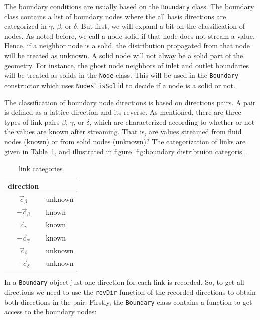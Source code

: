\documentclass[11pt,a4paper]{report}
\begin{document}
The boundary conditions are usually based on the \texttt{Boundary} class. The boundary class contains a list of  boundary nodes where the all basis directions are categorized in $\gamma$, $\beta$, or $\delta$. 
But first, we will expand a bit on the classification of nodes. As noted before, we call a node solid if that node does not stream a value. Hence, if a neighbor node is a solid, the distribution propagated from that node will be treated as unknown. A solid node will not alway be a solid part of the geometry. For instance, the ghost node neighbors of inlet and outlet boundaries will be treated as solids in the \texttt{Node} class. This will be used in the \texttt{Boundary} constructor which uses \texttt{Nodes}' \texttt{isSolid} to decide if a node is a solid or not.

The classification of boundary node directions is based on directions pairs. A pair is defined as a lattice direction and its reverse. As mentioned, there are three types of link pairs $\beta$, $\gamma$, or $\delta$, which
are characterized according to whether or not the values are known after streaming. That is, are values streamed from fluid nodes (known) or
from solid nodes (unknown)? The categorization of links are given in Table~\ref{tab:categorization of links}, and illustrated in figure \ref{fig:boundary distribtuion categoris}. 
\begin{table}
	\centering
	\begin{tabular}{|c|l|}\hline
		{\bf direction} &  \\ \hline
		$\vec{c}_\beta$ & unknown \\ 
		$-\vec{c}_\beta$ & known \\ \hline
		$\vec{c}_\gamma$ & known \\ 
		$-\vec{c}_\gamma$ & known \\ \hline
		$\vec{c}_\delta$ & unknown \\ 
		$-\vec{c}_\delta$ & unknown \\ \hline
	\end{tabular}
	\caption{link categories}
	\label{tab:categorization of links}
\end{table}
In a \texttt{Boundary} object just one direction for each link is recorded. So, to get all directions we need to use the \texttt{revDir} function of the recorded directions to obtain both directions in the pair.
Firstly, the \texttt{Boundary} class contains a function to get access to the boundary nodes:
\end{document}
